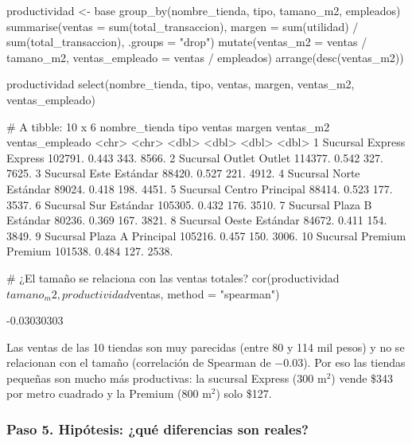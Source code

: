 \begin{rcode}
productividad <- base %
  group_by(nombre_tienda, tipo, tamano_m2, empleados) %
  summarise(ventas = sum(total_transaccion),
            margen = sum(utilidad) / sum(total_transaccion),
            .groups = "drop") %
  mutate(ventas_m2       = ventas / tamano_m2,
         ventas_empleado = ventas / empleados) %
  arrange(desc(ventas_m2))

productividad %
  select(nombre_tienda, tipo, ventas, margen, ventas_m2, ventas_empleado)
\end{rcode}
\begin{rsalida}
# A tibble: 10 x 6
   nombre_tienda    tipo       ventas margen ventas_m2 ventas_empleado
   <chr>            <chr>       <dbl>  <dbl>     <dbl>           <dbl>
 1 Sucursal Express Express   102791.  0.443      343.           8566.
 2 Sucursal Outlet  Outlet    114377.  0.542      327.           7625.
 3 Sucursal Este    Estándar   88420.  0.527      221.           4912.
 4 Sucursal Norte   Estándar   89024.  0.418      198.           4451.
 5 Sucursal Centro  Principal  88414.  0.523      177.           3537.
 6 Sucursal Sur     Estándar  105305.  0.432      176.           3510.
 7 Sucursal Plaza B Estándar   80236.  0.369      167.           3821.
 8 Sucursal Oeste   Estándar   84672.  0.411      154.           3849.
 9 Sucursal Plaza A Principal 105216.  0.457      150.           3006.
10 Sucursal Premium Premium   101538.  0.484      127.           2538.
\end{rsalida}

\begin{rcode}
# ¿El tamaño se relaciona con las ventas totales?
cor(productividad$tamano_m2, productividad$ventas, method = "spearman")
\end{rcode}
\begin{rsalida}
[1] -0.03030303
\end{rsalida}

Las ventas de las 10 tiendas son muy parecidas (entre 80 y 114 mil pesos) y
no se relacionan con el tamaño (correlación de Spearman de $-0.03$). Por
eso las tiendas pequeñas son mucho más productivas: la sucursal Express
(300 m$^2$) vende \$343 por metro cuadrado y la Premium (800 m$^2$) solo
\$127.

\subsubsection{Paso 5. Hipótesis: ¿qué diferencias son reales?}

